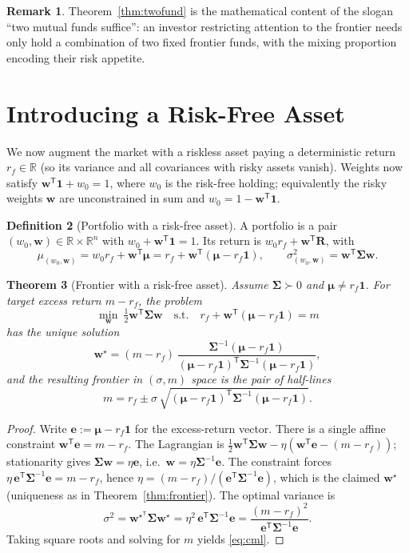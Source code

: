 \documentclass[11pt]{article}
\theoremstyle{definition}
\newtheorem{definition}{Definition}[section]
\newtheorem{remark}[definition]{Remark}
\theoremstyle{plain}
\newtheorem{theorem}[definition]{Theorem}
\newcommand{\R}{\mathbb{R}}
\newcommand{\one}{\mathbf{1}}
\newcommand{\bw}{\bm{w}}
\newcommand{\bmu}{\bm{\mu}}
\newcommand{\bSigma}{\bm{\Sigma}}
\newcommand{\T}{^{\mathsf{T}}}
\begin{document}
\begin{remark}
Theorem~\ref{thm:twofund} is the mathematical content of the slogan ``two mutual
funds suffice'': an investor restricting attention to the frontier needs only
hold a combination of two fixed frontier funds, with the mixing proportion
encoding their risk appetite.
\end{remark}

\section{Introducing a Risk-Free Asset}

We now augment the market with a riskless asset paying a deterministic return
$r_f \in \R$ (so its variance and all covariances with risky assets vanish).
Weights now satisfy $\bw\T\one + w_0 = 1$, where $w_0$ is the risk-free holding;
equivalently the risky weights $\bw$ are unconstrained in sum and
$w_0 = 1 - \bw\T\one$.

\begin{definition}[Portfolio with a risk-free asset]
A portfolio is a pair $(w_0, \bw) \in \R \times \R^n$ with
$w_0 + \bw\T\one = 1$. Its return is $w_0 r_f + \bw\T \bm{R}$, with
\[
\mu_{(w_0,\bw)} = w_0 r_f + \bw\T\bmu = r_f + \bw\T(\bmu - r_f \one),
\qquad
\sigma^2_{(w_0,\bw)} = \bw\T \bSigma \bw .
\]
\end{definition}

\begin{theorem}[Frontier with a risk-free asset]\label{thm:rf}
Assume $\bSigma \succ 0$ and $\bmu \ne r_f \one$. For target excess return
$m - r_f$, the problem
\[
\min_{\bw}\ \tfrac12 \bw\T\bSigma\bw
\quad\text{s.t.}\quad r_f + \bw\T(\bmu - r_f\one) = m
\]
has the unique solution
\[
\bw^\star = (m - r_f)\,
\frac{\bSigma^{-1}(\bmu - r_f\one)}{(\bmu - r_f\one)\T \bSigma^{-1}(\bmu - r_f\one)},
\]
and the resulting frontier in $(\sigma, m)$ space is the pair of half-lines
\begin{equation}\label{eq:cml}
m = r_f \pm \sigma \, \sqrt{(\bmu - r_f\one)\T \bSigma^{-1}(\bmu - r_f\one)} .
\end{equation}
\end{theorem}

\begin{proof}
Write $\bm{e} := \bmu - r_f \one$ for the excess-return vector. There is a single
affine constraint $\bw\T \bm{e} = m - r_f$. The Lagrangian is
$\tfrac12\bw\T\bSigma\bw - \eta(\bw\T\bm{e} - (m-r_f))$; stationarity gives
$\bSigma\bw = \eta \bm{e}$, i.e.\ $\bw = \eta \bSigma^{-1}\bm{e}$. The constraint
forces $\eta\, \bm{e}\T\bSigma^{-1}\bm{e} = m - r_f$, hence
$\eta = (m-r_f)/(\bm{e}\T\bSigma^{-1}\bm{e})$, which is the claimed $\bw^\star$
(uniqueness as in Theorem~\ref{thm:frontier}). The optimal variance is
\[
\sigma^2 = \bw^{\star\T}\bSigma\bw^\star
= \eta^2\, \bm{e}\T\bSigma^{-1}\bm{e}
= \frac{(m-r_f)^2}{\bm{e}\T\bSigma^{-1}\bm{e}} .
\]
Taking square roots and solving for $m$ yields \eqref{eq:cml}.
\end{proof}
\end{document}

